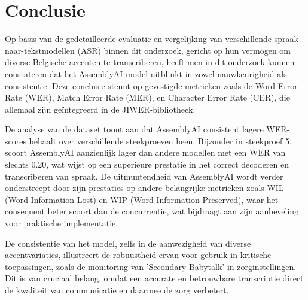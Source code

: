 
\chapter{Conclusie}%
\label{ch:conclusie}



Op basis van de gedetailleerde evaluatie en vergelijking van verschillende spraak-naar-tekstmodellen (ASR) binnen dit onderzoek, gericht op hun vermogen om diverse Belgische accenten te transcriberen, heeft men in dit onderzoek kunnen constateren dat het AssemblyAI-model uitblinkt in zowel nauwkeurigheid als consistentie. Deze conclusie steunt op gevestigde metrieken zoals de Word Error Rate (WER), Match Error Rate (MER), en Character Error Rate (CER), die allemaal zijn geïntegreerd in de JIWER-bibliotheek.

De analyse van de dataset toont aan dat AssemblyAI consistent lagere WER-scores behaalt over verschillende steekproeven heen. Bijzonder in steekproef 5, scoort AssemblyAI aanzienlijk lager dan andere modellen met een WER van slechts 0.20, wat wijst op een superieure prestatie in het correct decoderen en transcriberen van spraak. De uitmuntendheid van AssemblyAI wordt verder onderstreept door zijn prestaties op andere belangrijke metrieken zoals WIL (Word Information Lost) en WIP (Word Information Preserved), waar het consequent beter scoort dan de concurrentie, wat bijdraagt aan zijn aanbeveling voor praktische implementatie.

De consistentie van het model, zelfs in de aanwezigheid van diverse accentvariaties, illustreert de robuustheid ervan voor gebruik in kritische toepassingen, zoals de monitoring van 'Secondary Babytalk' in zorginstellingen. Dit is van cruciaal belang, omdat een accurate en betrouwbare transcriptie direct de kwaliteit van communicatie en daarmee de zorg verbetert.

